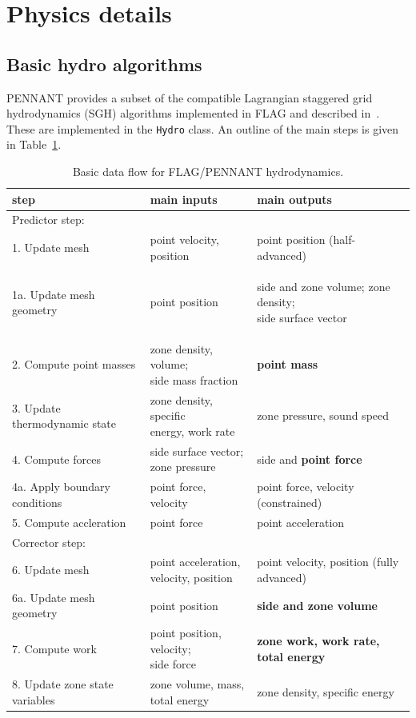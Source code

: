 \documentclass[11pt,letterpaper]{article}
\begin{document}
\section{Physics details}

\subsection{Basic hydro algorithms}

PENNANT provides a subset of the compatible Lagrangian staggered grid
hydrodynamics (SGH) algorithms implemented in FLAG and described
in~\cite{hydro}.  These are implemented in the {\tt Hydro} class.
An outline of the main steps is given in Table~\ref{tbl:dataflow}.

\def\RR{\raggedright}

\begin{table}
\caption{Basic data flow for FLAG/PENNANT hydrodynamics.}
\label{tbl:dataflow}
\begin{tabular}{lp{108pt}p{180pt}}
    \hline
    step & main inputs & main outputs \\
    \hline
    Predictor step: \\
    1. Update mesh & point velocity, position & point position (half-advanced) \\
    1a. Update mesh geometry & point position & {\bf {\RR side and zone volume; zone density; \\ side surface vector } } \\
    2. Compute point masses & {\RR zone density, volume; \\ side mass fraction} & {\bf point mass} \\
    3. Update thermodynamic state & {\RR zone density, specific\\ energy, work rate} & zone pressure, sound speed \\
    4. Compute forces & {\RR side surface vector; \\ zone pressure} & side and {\bf point force} \\
    4a. Apply boundary conditions & point force, velocity & point force, velocity (constrained) \\
    5. Compute accleration & point force & point acceleration \\
    \hline
    Corrector step: \\
    6. Update mesh & {\RR point acceleration, \\ velocity, position} & point velocity, position (fully advanced) \\
    6a. Update mesh geometry & point position & {\bf side and zone volume} \\
    7. Compute work & {\RR point position, velocity; \\ side force} & {\bf zone work, work rate, total energy} \\
    8. Update zone state variables & {\RR zone volume, mass,\\ total energy} & zone density, specific energy \\
    \hline
\end{tabular}
\end{table}
\end{document}
